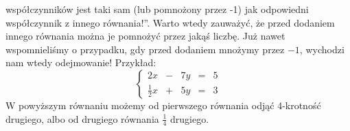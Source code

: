 \documentclass{article}
\theoremstyle{remark}
\begin{document}
współczynników jest taki sam (lub pomnożony przez -1) jak odpowiedni 
współczynnik z innego równania!''.
Warto wtedy zauważyć, że przed dodaniem innego równania można je 
pomnożyć przez jakąś liczbę. Już nawet wspomnieliśmy o przypadku, gdy przed dodaniem
mnożymy przez $-1$, wychodzi nam wtedy odejmowanie! Przykład:
\begin{displaymath}
  \left\{ 
    \begin{array}{lllll}
      2x &-& 7y &=& 5\\
      \tfrac12x &+& 5y &=& 3
    \end{array}
    \right.
\end{displaymath}
W powyższym równaniu możemy od pierwszego równania odjąć 4-krotność drugiego, 
albo od drugiego równania $\tfrac14$ drugiego.
\end{document}
